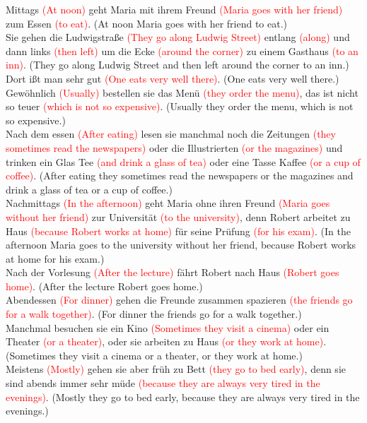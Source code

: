 \documentclass{article}
\begin{document}
Mittags \textcolor{red}{(At noon)} geht Maria mit ihrem Freund \textcolor{red}{(Maria goes with her friend)} zum Essen \textcolor{red}{(to eat)}. (At noon Maria goes with her friend to eat.) \\
Sie gehen die Ludwigstraße \textcolor{red}{(They go along Ludwig Street)} entlang \textcolor{red}{(along)} und dann links \textcolor{red}{(then left)} um die Ecke \textcolor{red}{(around the corner)} zu einem Gasthaus \textcolor{red}{(to an inn)}. (They go along Ludwig Street and then left around the corner to an inn.) \\
Dort ißt man sehr gut \textcolor{red}{(One eats very well there)}. (One eats very well there.) \\
Gewöhnlich \textcolor{red}{(Usually)} bestellen sie das Menü \textcolor{red}{(they order the menu)}, das ist nicht so teuer \textcolor{red}{(which is not so expensive)}. (Usually they order the menu, which is not so expensive.) \\
Nach dem essen \textcolor{red}{(After eating)} lesen sie manchmal noch die Zeitungen \textcolor{red}{(they sometimes read the newspapers)} oder die Illustrierten \textcolor{red}{(or the magazines)} und trinken ein Glas Tee \textcolor{red}{(and drink a glass of tea)} oder eine Tasse Kaffee \textcolor{red}{(or a cup of coffee)}. (After eating they sometimes read the newspapers or the magazines and drink a glass of tea or a cup of coffee.) \\
Nachmittags \textcolor{red}{(In the afternoon)} geht Maria ohne ihren Freund \textcolor{red}{(Maria goes without her friend)} zur Universität \textcolor{red}{(to the university)}, denn Robert arbeitet zu Haus \textcolor{red}{(because Robert works at home)} für seine Prüfung \textcolor{red}{(for his exam)}. (In the afternoon Maria goes to the university without her friend, because Robert works at home for his exam.) \\
Nach der Vorlesung \textcolor{red}{(After the lecture)} fährt Robert nach Haus \textcolor{red}{(Robert goes home)}. (After the lecture Robert goes home.) \\
Abendessen \textcolor{red}{(For dinner)} gehen die Freunde zusammen spazieren \textcolor{red}{(the friends go for a walk together)}. (For dinner the friends go for a walk together.) \\
Manchmal besuchen sie ein Kino \textcolor{red}{(Sometimes they visit a cinema)} oder ein Theater \textcolor{red}{(or a theater)}, oder sie arbeiten zu Haus \textcolor{red}{(or they work at home)}. (Sometimes they visit a cinema or a theater, or they work at home.) \\
Meistens \textcolor{red}{(Mostly)} gehen sie aber früh zu Bett \textcolor{red}{(they go to bed early)}, denn sie sind abends immer sehr müde \textcolor{red}{(because they are always very tired in the evenings)}. (Mostly they go to bed early, because they are always very tired in the evenings.)
\end{document}
